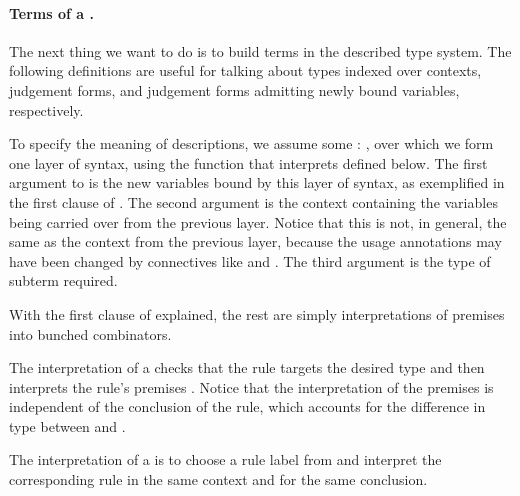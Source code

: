 \paragraph{Terms of a .}

The next thing we want to do is to build terms in the described type system.
The following definitions are useful for talking about types indexed over
contexts, judgement forms, and judgement forms admitting newly bound variables,
respectively.


To specify the meaning of descriptions, we assume some  : ,
over which we form one layer of syntax, using the function
 that interprets
 defined below.  The first argument to
 is the new variables bound by this layer of syntax, as
exemplified in the first clause of
.  The second argument is
the context containing the variables being carried over from the
previous layer.  Notice that this is not, in general, the same as the
context from the previous layer, because the usage annotations may
have been changed by connectives like
 and
.  The third argument is the
type of subterm required.

With the first clause of  explained,
the rest are simply interpretations of premises into bunched combinators.


The interpretation of a  checks that the rule targets
the desired type and then interprets the rule's premises .
Notice that the interpretation of the premises is independent of the conclusion
of the rule, which accounts for the difference in type between
 and
.


The interpretation of a  is to choose a rule label
 from  and interpret the corresponding rule
\AgdaSpace{} in the same context and for the same
conclusion.


